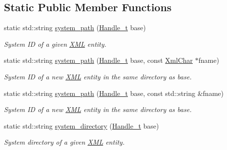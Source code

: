 \subsection*{Static Public Member Functions}
\begin{DoxyCompactItemize}
\item 
static std::string \hyperlink{class_d_d4hep_1_1_x_m_l_1_1_document_handler_a606d6b73c50047ecdb1df4c69be320f6}{system\_\-path} (\hyperlink{class_d_d4hep_1_1_x_m_l_1_1_handle__t}{Handle\_\-t} base)
\begin{DoxyCompactList}\small\item\em System ID of a given \hyperlink{namespace_d_d4hep_1_1_x_m_l}{XML} entity. \item\end{DoxyCompactList}\item 
static std::string \hyperlink{class_d_d4hep_1_1_x_m_l_1_1_document_handler_a6cc1864ffc55f0a9168f5238ea5c06fd}{system\_\-path} (\hyperlink{class_d_d4hep_1_1_x_m_l_1_1_handle__t}{Handle\_\-t} base, const \hyperlink{namespace_d_d4hep_1_1_x_m_l_a09e5d9cc86ed782f6826dfe0778c1815}{XmlChar} $\ast$fname)
\begin{DoxyCompactList}\small\item\em System ID of a new \hyperlink{namespace_d_d4hep_1_1_x_m_l}{XML} entity in the same directory as base. \item\end{DoxyCompactList}\item 
static std::string \hyperlink{class_d_d4hep_1_1_x_m_l_1_1_document_handler_a86278c2d562210ce1c6cbf31cba46a86}{system\_\-path} (\hyperlink{class_d_d4hep_1_1_x_m_l_1_1_handle__t}{Handle\_\-t} base, const std::string \&fname)
\begin{DoxyCompactList}\small\item\em System ID of a new \hyperlink{namespace_d_d4hep_1_1_x_m_l}{XML} entity in the same directory as base. \item\end{DoxyCompactList}\item 
static std::string \hyperlink{class_d_d4hep_1_1_x_m_l_1_1_document_handler_aac81a43d656b9c4149d6e40642abf0fb}{system\_\-directory} (\hyperlink{class_d_d4hep_1_1_x_m_l_1_1_handle__t}{Handle\_\-t} base)
\begin{DoxyCompactList}\small\item\em System directory of a given \hyperlink{namespace_d_d4hep_1_1_x_m_l}{XML} entity. \item\end{DoxyCompactList}\item 

\end{DoxyCompactItemize}
